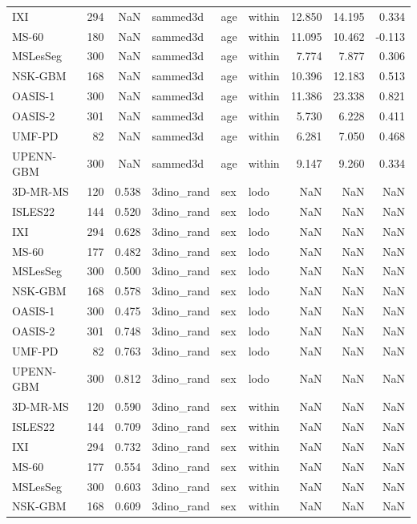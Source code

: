 \begin{tabular}{lrrlllrrr}
IXI & 294 & NaN & sammed3d & age & within & 12.850 & 14.195 & 0.334 \\
MS-60 & 180 & NaN & sammed3d & age & within & 11.095 & 10.462 & -0.113 \\
MSLesSeg & 300 & NaN & sammed3d & age & within & 7.774 & 7.877 & 0.306 \\
NSK-GBM & 168 & NaN & sammed3d & age & within & 10.396 & 12.183 & 0.513 \\
OASIS-1 & 300 & NaN & sammed3d & age & within & 11.386 & 23.338 & 0.821 \\
OASIS-2 & 301 & NaN & sammed3d & age & within & 5.730 & 6.228 & 0.411 \\
UMF-PD & 82 & NaN & sammed3d & age & within & 6.281 & 7.050 & 0.468 \\
UPENN-GBM & 300 & NaN & sammed3d & age & within & 9.147 & 9.260 & 0.334 \\
3D-MR-MS & 120 & 0.538 & 3dino\_rand & sex & lodo & NaN & NaN & NaN \\
ISLES22 & 144 & 0.520 & 3dino\_rand & sex & lodo & NaN & NaN & NaN \\
IXI & 294 & 0.628 & 3dino\_rand & sex & lodo & NaN & NaN & NaN \\
MS-60 & 177 & 0.482 & 3dino\_rand & sex & lodo & NaN & NaN & NaN \\
MSLesSeg & 300 & 0.500 & 3dino\_rand & sex & lodo & NaN & NaN & NaN \\
NSK-GBM & 168 & 0.578 & 3dino\_rand & sex & lodo & NaN & NaN & NaN \\
OASIS-1 & 300 & 0.475 & 3dino\_rand & sex & lodo & NaN & NaN & NaN \\
OASIS-2 & 301 & 0.748 & 3dino\_rand & sex & lodo & NaN & NaN & NaN \\
UMF-PD & 82 & 0.763 & 3dino\_rand & sex & lodo & NaN & NaN & NaN \\
UPENN-GBM & 300 & 0.812 & 3dino\_rand & sex & lodo & NaN & NaN & NaN \\
3D-MR-MS & 120 & 0.590 & 3dino\_rand & sex & within & NaN & NaN & NaN \\
ISLES22 & 144 & 0.709 & 3dino\_rand & sex & within & NaN & NaN & NaN \\
IXI & 294 & 0.732 & 3dino\_rand & sex & within & NaN & NaN & NaN \\
MS-60 & 177 & 0.554 & 3dino\_rand & sex & within & NaN & NaN & NaN \\
MSLesSeg & 300 & 0.603 & 3dino\_rand & sex & within & NaN & NaN & NaN \\
NSK-GBM & 168 & 0.609 & 3dino\_rand & sex & within & NaN & NaN & NaN \\

\end{tabular}
